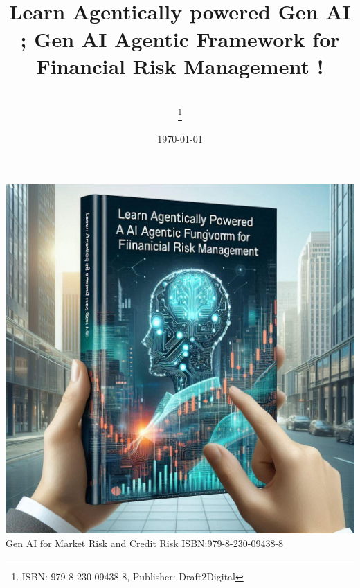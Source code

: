 \documentclass[a4paper,headinclude=on,footinclude=on,12pt,oneside]{scrbook}
\begin{document}
	
	
	\clearpage  %
	\thispagestyle{empty}  %
	\begin{center}
		\includegraphics[width=\textwidth, height=\textheight, keepaspectratio]{images/cover}
		Gen AI for Market Risk and Credit Risk
		ISBN:979-8-230-09438-8
		
	\end{center}
	
	\clearpage  %
	
	
	\title{\\\small{Learn Agentically powered Gen AI ;  
			Gen AI Agentic Framework for Financial Risk Management !   }}
	\author{
		\\
		\thanks{ISBN: 979-8-230-09438-8, Publisher: Draft2Digital}}
		
			
	\date{\today}
	
	\maketitle
	\tableofcontents
	
	\listoffigures
	
\end{document}
